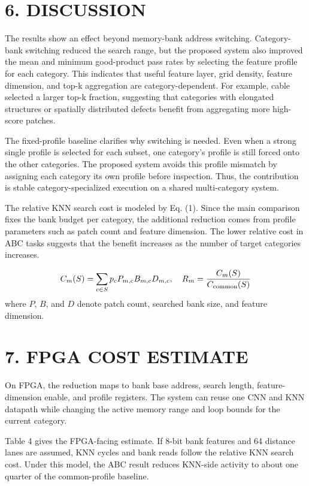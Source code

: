 \documentclass[a4paper,twocolumn,10pt]{article}
\begin{document}
\section*{6. DISCUSSION}
The results show an effect beyond memory-bank address switching. Category-bank switching reduced the search range, but the proposed system also improved the mean and minimum good-product pass rates by selecting the feature profile for each category. This indicates that useful feature layer, grid density, feature dimension, and top-k aggregation are category-dependent. For example, cable selected a larger top-k fraction, suggesting that categories with elongated structures or spatially distributed defects benefit from aggregating more high-score patches.

The fixed-profile baseline clarifies why switching is needed. Even when a strong single profile is selected for each subset, one category's profile is still forced onto the other categories. The proposed system avoids this profile mismatch by assigning each category its own profile before inspection. Thus, the contribution is stable category-specialized execution on a shared multi-category system.

The relative KNN search cost is modeled by Eq. (1). Since the main comparison fixes the bank budget per category, the additional reduction comes from profile parameters such as patch count and feature dimension. The lower relative cost in ABC tasks suggests that the benefit increases as the number of target categories increases.

\begin{equation}
C_m(S)=\sum_{c\in S}p_c P_{m,c}B_{m,c}D_{m,c},\quad R_m=\frac{C_m(S)}{C_{\rm common}(S)}
\end{equation}
\noindent where $P$, $B$, and $D$ denote patch count, searched bank size, and feature dimension.
\section*{7. FPGA COST ESTIMATE}
On FPGA, the reduction maps to bank base address, search length, feature-dimension enable, and profile registers. The system can reuse one CNN and KNN datapath while changing the active memory range and loop bounds for the current category.

Table 4 gives the FPGA-facing estimate. If 8-bit bank features and 64 distance lanes are assumed, KNN cycles and bank reads follow the relative KNN search cost. Under this model, the ABC result reduces KNN-side activity to about one quarter of the common-profile baseline.
\end{document}
